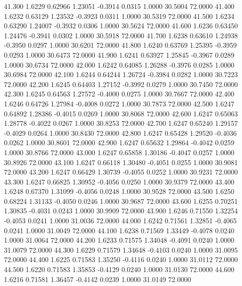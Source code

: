   41.300   1.6229   0.62966   1.23051  -0.3914   0.0315   1.0000  30.5004  72.0000
  41.400   1.6232   0.63129   1.23532  -0.3923   0.0311   1.0000  30.5319  72.0000
  41.500   1.6234   0.63290   1.24007  -0.3932   0.0306   1.0000  30.5624  72.0000
  41.600   1.6236   0.63450   1.24476  -0.3941   0.0302   1.0000  30.5918  72.0000
  41.700   1.6238   0.63610   1.24938  -0.3950   0.0297   1.0000  30.6201  72.0000
  41.800   1.6240   0.63769   1.25395  -0.3959   0.0293   1.0000  30.6473  72.0000
  41.900   1.6241   0.63927   1.25845  -0.3967   0.0289   1.0000  30.6734  72.0000
  42.000   1.6242   0.64085   1.26288  -0.3976   0.0285   1.0000  30.6984  72.0000
  42.100   1.6244   0.64244   1.26724  -0.3984   0.0282   1.0000  30.7223  72.0000
  42.200   1.6245   0.64403   1.27152  -0.3992   0.0279   1.0000  30.7450  72.0000
  42.300   1.6245   0.64563   1.27572  -0.4000   0.0275   1.0000  30.7667  72.0000
  42.400   1.6246   0.64726   1.27984  -0.4008   0.0272   1.0000  30.7873  72.0000
  42.500   1.6247   0.64892   1.28386  -0.4015   0.0269   1.0000  30.8068  72.0000
  42.600   1.6247   0.65063   1.28778  -0.4022   0.0267   1.0000  30.8253  72.0000
  42.700   1.6247   0.65240   1.29157  -0.4029   0.0264   1.0000  30.8430  72.0000
  42.800   1.6247   0.65428   1.29520  -0.4036   0.0262   1.0000  30.8601  72.0000
  42.900   1.6247   0.65632   1.29864  -0.4042   0.0259   1.0000  30.8766  72.0000
  43.000   1.6247   0.65858   1.30186  -0.4047   0.0257   1.0000  30.8926  72.0000
  43.100   1.6247   0.66118   1.30480  -0.4051   0.0255   1.0000  30.9081  72.0000
  43.200   1.6247   0.66429   1.30739  -0.4055   0.0252   1.0000  30.9231  72.0000
  43.300   1.6247   0.66825   1.30952  -0.4056   0.0250   1.0000  30.9379  72.0000
  43.400   1.6248   0.67370   1.31099  -0.4056   0.0248   1.0000  30.9528  72.0000
  43.500   1.6250   0.68224   1.31133  -0.4050   0.0246   1.0000  30.9687  72.0000
  43.600   1.6255   0.70251   1.30835  -0.4031   0.0243   1.0000  30.9909  72.0000
  43.900   1.6246   0.71550   1.32254  -0.4053   0.0241   1.0000  31.0036  72.0000
  44.000   1.6242   0.71561   1.32851  -0.4065   0.0241   1.0000  31.0049  72.0000
  44.100   1.6238   0.71569   1.33449  -0.4078   0.0240   1.0000  31.0064  72.0000
  44.200   1.6233   0.71575   1.34048  -0.4091   0.0240   1.0000  31.0079  72.0000
  44.300   1.6229   0.71579   1.34648  -0.4103   0.0240   1.0000  31.0095  72.0000
  44.400   1.6225   0.71583   1.35250  -0.4116   0.0240   1.0000  31.0112  72.0000
  44.500   1.6220   0.71583   1.35853  -0.4129   0.0240   1.0000  31.0130  72.0000
  44.600   1.6216   0.71581   1.36457  -0.4142   0.0239   1.0000  31.0149  72.0000
